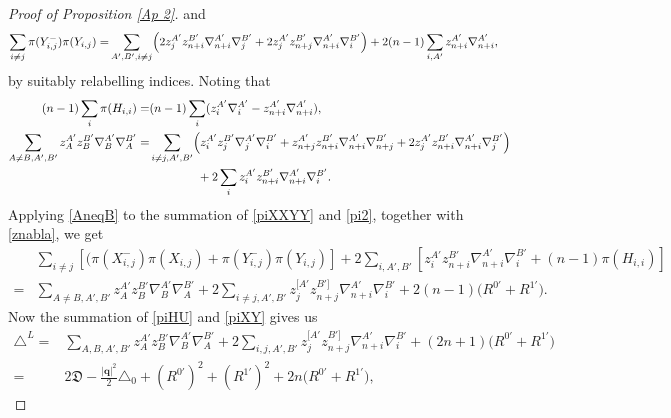 \documentclass[a4paper,11pt]{amsart}
\numberwithin{equation}{section}
\begin{document}
\begin{proof}[Proof of Proposition \ref{Ap 2}]
and
\begin{equation}\begin{aligned}\label{pi2}
\sum_{i\neq j} \pi(Y_{i,j}^{-})\pi(Y_{i,j})
=&\sum_{A',B',i\neq j} \Bigl( 2z_{j}^{A'} z_{n+i}^{B'} \nabla_{n+i}^{A'} \nabla_{j}^{B'}
+ 2z_{j}^{A'} z_{n+j}^{B'} \nabla_{n+i}^{A'} \nabla_{i}^{B'}\Bigr)+2(n-1)\sum_{i,A'}z_{n+i}^{A'}\nabla_{n+i}^{A'},
\end{aligned}\end{equation}
by suitably relabelling indices.
Noting that
\begin{equation}\begin{aligned}\label{AneqB}
(n-1)\sum_{i}\pi(H_{i,i})=&(n-1)\sum_{i}(z_i^{A'}\nabla_{i}^{A'}-z_{n+i}^{A'}\nabla_{n+i}^{A'}),\\
\sum_{A\neq B,A',B'}z_{A}^{A'} z_{B}^{B'} \nabla_{B}^{A'} \nabla_{A}^{B'}=&\sum_{i\neq j,A',B'}\Bigl( z_{i}^{A'} z_{j}^{B'} \nabla_{j}^{A'} \nabla_{i}^{B'}
+ z_{n+j}^{A'} z_{n+i}^{B'} \nabla_{n+i}^{A'} \nabla_{n+j}^{B'}+ 2z_{j}^{A'} z_{n+i}^{B'} \nabla_{n+i}^{A'} \nabla_{j}^{B'}\Bigl)\\
&\qquad\qquad+2\sum_{i}z_{i}^{A'} z_{n+i}^{B'} \nabla_{n+i}^{A'} \nabla_{i}^{B'}.
\end{aligned}\end{equation}
Applying \eqref{AneqB} to the summation of \eqref{piXXYY} and \eqref{pi2}, together with \eqref{znabla}, we get
\begin{equation}\begin{aligned}\label{piXY}
&\sum_{i\neq j}\left[(\pi(X_{i,j}^-)\pi(X_{i,j})
+ \pi(Y_{i,j}^{-})\pi(Y_{i,j})\right]+2\sum_{i,A',B'}\left[z_{i}^{A'} z_{n+i}^{B'} \nabla_{n+i}^{A'} \nabla_{i}^{B'}+(n-1)\pi(H_{i,i})\right] \\
=&\sum_{A\neq B,A',B'}z_{A}^{A'} z_{B}^{B'} \nabla_{B}^{A'} \nabla_{A}^{B'}+2\sum_{i\neq j,A',B'}z_{j}^{[A'} z_{n+j}^{B']} \nabla_{n+i}^{A'}\nabla_{i}^{B'}
+ 2(n-1)\bigl(R^{0'}+R^{1'}\bigr).
\end{aligned}\end{equation}
Now the summation of \eqref{piHU} and \eqref{piXY} gives us
\begin{equation}\begin{aligned}
\triangle^L=&\sum_{A, B,A',B'}z_{A}^{A'} z_{B}^{B'} \nabla_{B}^{A'} \nabla_{A}^{B'}+2\sum_{i, j, A',B'}z_{j}^{[A'} z_{n+j}^{B']} \nabla_{n+i}^{A'}\nabla_{i}^{B'}
+(2n+1)\bigl(R^{0'}+R^{1'}\bigr)\\
=&2\mathfrak{D}-\frac{|\mathbf{q}|^2}{2}\triangle_0+(R^{0'})^2+(R^{1'})^2+ 2n\bigl(R^{0'}+R^{1'}\bigr),
\end{aligned}\end{equation}

\end{proof}
\end{document}
